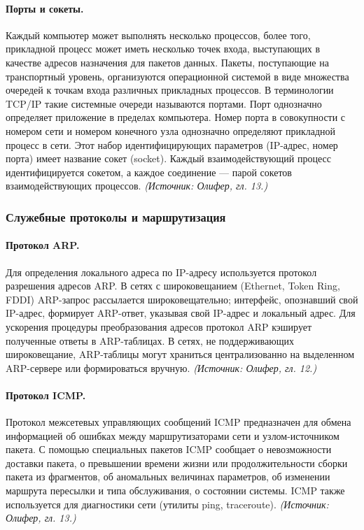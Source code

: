 \documentclass[a4paper,12pt]{article}
\begin{document}
\paragraph{Порты и сокеты.}
Каждый компьютер может выполнять несколько процессов, более того, прикладной процесс может иметь несколько точек входа, выступающих в качестве адресов назначения для пакетов данных. Пакеты, поступающие на транспортный уровень, организуются операционной системой в виде множества очередей к точкам входа различных прикладных процессов. В терминологии TCP/IP такие системные очереди называются портами. Порт однозначно определяет приложение в пределах компьютера. Номер порта в совокупности с номером сети и номером конечного узла однозначно определяют прикладной процесс в сети. Этот набор идентифицирующих параметров (IP-адрес, номер порта) имеет название сокет (socket). Каждый взаимодействующий процесс идентифицируется сокетом, а каждое соединение — парой сокетов взаимодействующих процессов.
\textit{(Источник: Олифер, гл. 13.)}

\subsubsection{Служебные протоколы и маршрутизация}

\paragraph{Протокол ARP.}
Для определения локального адреса по IP-адресу используется протокол разрешения адресов ARP. В сетях с широковещанием (Ethernet, Token Ring, FDDI) ARP-запрос рассылается широковещательно; интерфейс, опознавший свой IP-адрес, формирует ARP-ответ, указывая свой IP-адрес и локальный адрес. Для ускорения процедуры преобразования адресов протокол ARP кэширует полученные ответы в ARP-таблицах. В сетях, не поддерживающих широковещание, ARP-таблицы могут храниться централизованно на выделенном ARP-сервере или формироваться вручную.
\textit{(Источник: Олифер, гл. 12.)}

\paragraph{Протокол ICMP.}
Протокол межсетевых управляющих сообщений ICMP предназначен для обмена информацией об ошибках между маршрутизаторами сети и узлом-источником пакета. С помощью специальных пакетов ICMP сообщает о невозможности доставки пакета, о превышении времени жизни или продолжительности сборки пакета из фрагментов, об аномальных величинах параметров, об изменении маршрута пересылки и типа обслуживания, о состоянии системы. ICMP также используется для диагностики сети (утилиты ping, traceroute).
\textit{(Источник: Олифер, гл. 13.)}
\end{document}

